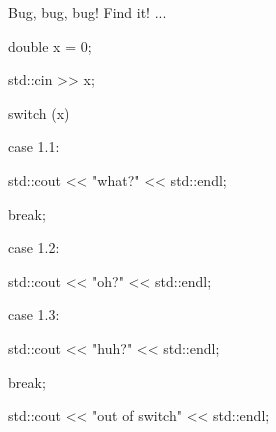 Bug, bug, bug! Find it! ...

\begin{console}

double x = 0;

std::cin >> x;

switch (x)

{

        case 1.1:

             std::cout << "what?" << std::endl;

             break;

             

        case 1.2:

             std::cout << "oh?" << std::endl;

        

        case 1.3:

             std::cout << "huh?" << std::endl;

             break;

}

std::cout << "out of switch" << std::endl;

\end{console}

